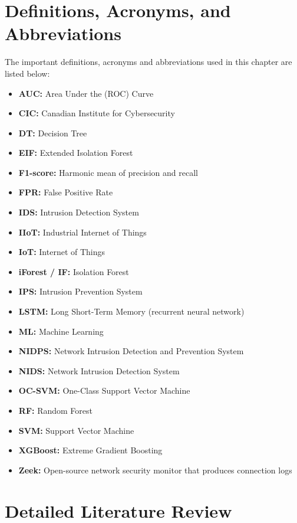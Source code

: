 \section{Definitions, Acronyms, and Abbreviations}\label{sec:3.1}

\noindent The important definitions, acronyms and abbreviations used in this chapter are listed below:

\begin{itemize}
\item \textbf{AUC:} Area Under the (ROC) Curve
\item \textbf{CIC:} Canadian Institute for Cybersecurity
\item \textbf{DT:} Decision Tree
\item \textbf{EIF:} Extended Isolation Forest
\item \textbf{F1-score:} Harmonic mean of precision and recall
\item \textbf{FPR:} False Positive Rate
\item \textbf{IDS:} Intrusion Detection System
\item \textbf{IIoT:} Industrial Internet of Things
\item \textbf{IoT:} Internet of Things
\item \textbf{iForest / IF:} Isolation Forest
\item \textbf{IPS:} Intrusion Prevention System
\item \textbf{LSTM:} Long Short-Term Memory (recurrent neural network)
\item \textbf{ML:} Machine Learning
\item \textbf{NIDPS:} Network Intrusion Detection and Prevention System
\item \textbf{NIDS:} Network Intrusion Detection System
\item \textbf{OC-SVM:} One-Class Support Vector Machine
\item \textbf{RF:} Random Forest
\item \textbf{SVM:} Support Vector Machine
\item \textbf{XGBoost:} Extreme Gradient Boosting
\item \textbf{Zeek:} Open-source network security monitor that produces connection logs
\end{itemize}

\section{Detailed Literature Review}\label{sec:3.2}

